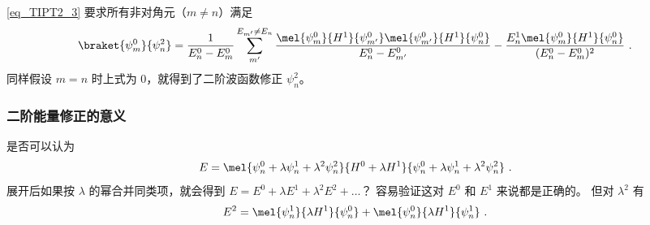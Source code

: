 \autoref{eq_TIPT2_3} 要求所有非对角元（$m\ne n$）满足
\begin{equation} %
\braket{\psi_m^0}{\psi_n^2} =
\frac{1}{E_n^0-E_m^0}\sum_{m'}^{E_{m'}\ne E_n}\frac{\mel{\psi_m^0}{H^1}{\psi_{m'}^0}\mel{\psi_{m'}^0}{H^1}{\psi_n^0}}{E_n^0 - E_{m'}^0} - \frac{E_n^1\mel{\psi_m^0}{H^1}{\psi_n^0}}{(E_n^0 - E_m^0)^2}~.
\end{equation}
同样假设 $m=n$ 时上式为 0，就得到了二阶波函数修正 $\psi_n^2$。

\subsubsection{二阶能量修正的意义}
是否可以认为
\begin{equation}
E = \mel{\psi_n^0 + \lambda\psi_n^1 + \lambda^2\psi_n^2}{H^0 + \lambda H^1}{\psi_n^0 + \lambda\psi_n^1 + \lambda^2 \psi_n^2}~.
\end{equation}
展开后如果按 $\lambda$ 的幂合并同类项，就会得到 $E = E^0 + \lambda E^1 + \lambda^2 E^2 + \dots$？ 容易验证这对 $E^0$ 和 $E^1$ 来说都是正确的。 但对 $\lambda^2$ 有
\begin{equation}
E^2 = \mel{\psi_n^1}{\lambda H^1}{\psi_n^0} + \mel{\psi_n^0}{\lambda H^1}{\psi_n^1}~.
\end{equation}

